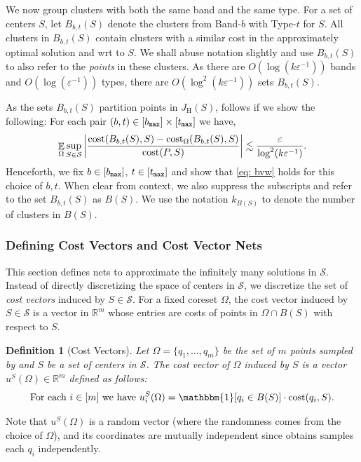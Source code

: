 \documentclass[11pt]{article}
\newtheorem{definition}[lemma]{Definition}
\theoremstyle{restate}
\theoremstyle{definition}
\newcommand{\eps}{\ensuremath{\varepsilon}}
\newcommand{\R}{\ensuremath{\mathbb{R}}}
\newcommand{\E}{\mathop{\mathbb{E}}}
\newcommand{\cost}{\textnormal{cost}}
\newcommand{\costom}{\cost_\Omega} %
\newcommand{\bmax}{b_\ensuremath{\textnormal{\texttt{max}}}}
\newcommand{\tmax}{t_\ensuremath{\textnormal{\texttt{max}}}}
\newcommand{\highc}[1]{J_{\text{H}}(#1)}
\begin{document}
 We now group clusters with both the same band and the same type. For a set of centers $S$, let $B_{b,t}(S)$ denote the clusters from Band-$b$ with Type-$t$ for $S$. All clusters in $B_{b,t}(S)$ contain clusters with a similar cost in the approximately optimal solution and wrt to $S$. We shall abuse notation slightly and use $B_{b,t}(S)$ to also refer to the \textit{points} in these clusters. As there are $O(\log(k\eps^{-1}))$ bands and $O(\log ( \eps^{-1}))$ types, there are $O(\log^2(k \eps^{-1}))$ sets $B_{b,t}(S)$.


As the sets $B_{b,t}(S)$ partition points in $\highc{S}$,  follows if we show the following: For each pair $(b,t) \in [\bmax] \times [\tmax]$ we have,
\begin{align}\label{eq: bvw}
     \E_{\Omega} \sup_{S \in \mathcal{S}}\left\rvert\frac{\cost(B_{b,t}(S), S) - \costom(B_{b,t}(S), S)}{\cost(P,S)} \right\rvert \lesssim \frac{\eps}{\log^2(k \eps^{-1})}.
\end{align}
 Henceforth, we fix $b \in [\bmax]$, $t \in [\tmax]$ and show that \eqref{eq: bvw} holds for this choice of $b, t$. When clear from context, we also suppress the subscripts and refer to the set $B_{b,t}(S)$ as $B(S)$. We use the notation $k_{B(S)}$ to denote the number of clusters in $B(S)$.





\subsubsection{Defining Cost Vectors and Cost Vector Nets}\label{sec: chaining-nets}
This section defines nets to approximate the infinitely many solutions in $\mathcal{S}$. Instead of directly discretizing the space of centers in $\mathcal{S}$, we discretize the set of \textit{cost vectors} induced by $S \in \mathcal{S} $. For a fixed coreset $\Omega$, the cost vector induced by $S \in \mathcal{S}$ is a vector in $\R^m$ whose entries are costs of points in $\Omega \cap B(S)$ with respect to $S$. 
\begin{definition}[Cost Vectors] Let $\Omega = \{q_1, \ldots, q_m\}$ be the set of $m$ points sampled by  and $S$ be a set of centers in $\mathcal{S}$. The cost vector of $\Omega$ induced by $S$ is a vector $u^S(\Omega) \in \R^m$ defined as follows:
    \begin{align}\label{eq: us}
    \text{For each $i \in[m]$}  \text{ we have } u^S_{i}(\Omega) = \mathbbm{1}[q_i \in  B(S)] \cdot \cost(q_i,S).
    \end{align}
\end{definition}
 Note that $u^S(\Omega)$ is a random vector (where the randomness comes from the choice of $\Omega$), and its coordinates are mutually independent since  obtains samples each $q_i$ independently.
\end{document}
